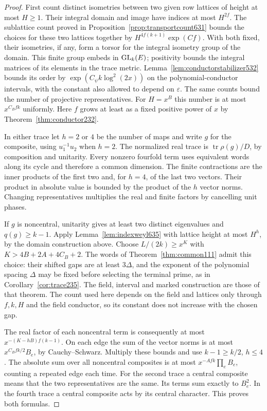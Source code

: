 \documentclass[a4paper,11pt]{article}
\theoremstyle{definition}
\theoremstyle{remark}
\numberwithin{equation}{section}
\begin{document}
\begin{proof}
First count distinct isometries between two given row lattices
of height at most \(H\ge1\). Their integral domain and image have
indices at most \(H^{2f}\). The sublattice count proved in
Proposition~\ref{prop:transportcount631} bounds the choices for
these two lattices together by
\(H^{4f(k+1)}\exp(Cf)\). With both fixed, their isometries, if
any, form a torsor for the integral isometry group of the domain.
This finite group embeds in \({\rm GL}_k(E)\); positivity bounds
the integral matrices of its elements in the trace metric.
Lemma~\ref{lem:conductorstabilizer532} bounds its order by
\(\exp(C_\psi k\log^2(2x))\) on the polynomial-conductor intervals,
with the constant also allowed to depend on \(\varepsilon\).
The same counts bound the number of projective representatives.
For \(H=x^B\) this number is at most \(x^{C_Bfk}\) uniformly.
Here \(f\) grows at least as a fixed positive power of \(x\) by
Theorem~\ref{thm:conductor232}.

In either trace let \(h=2\) or \(4\) be the number of maps and
write \(g\) for the composite, using \(u_1^{-1}u_2\) when \(h=2\).
The normalized real trace is \(\operatorname{tr}\rho(g)/D\), by
composition and unitarity. Every nonzero fourfold term uses
equivalent words along its cycle and therefore a common dimension.
The finite contractions are the inner products of the first two
and, for \(h=4\), of the last two vectors. Their product in
absolute value is bounded by the product of the \(h\) vector norms.
Changing representatives multiplies the real and finite factors
by cancelling unit phases.

If \(g\) is noncentral, unitarity gives at least two distinct
eigenvalues and \(q(g)\ge k-1\). Apply Lemma~\ref{lem:indexweyl635}
with lattice height at most \(H^h\), by the domain construction above.
Choose \(L/(2k)\ge x^K\) with \(K>4B+2A+4C_B+2\).
The words of Theorem~\ref{thm:common111} admit this choice:
their shifted gaps are at least \(3\Delta\), and the exponent
of the polynomial spacing \(\Delta\) may be fixed before selecting
the terminal prime, as in Corollary~\ref{cor:trace235}.
The field, interval and marked construction are those of that
theorem. The count used here depends on the field and lattices
only through \(f,k,H\) and the field conductor, so its constant
does not increase with the chosen gap.

The real factor of each noncentral term is consequently at most
\(x^{-(K-hB)f(k-1)}\). On each edge the sum of the vector norms
is at most \(x^{C_Bfk/2}B_e\), by Cauchy--Schwarz. Multiply these
bounds and use \(k-1\ge k/2\), \(h\le4\). The absolute sum over
all noncentral composites is at most \(x^{-Afk}\prod_e B_e\),
counting a repeated edge each time. For the second trace a central
composite means that the two representatives are the same. Its
terms sum exactly to \(B_e^2\). In the fourth trace a central
composite acts by its central character. This proves both formulas.
\end{proof}
\end{document}
